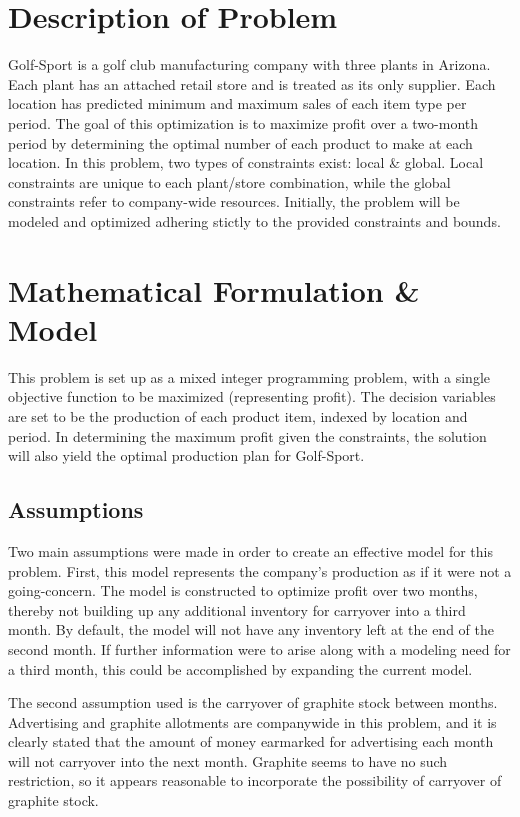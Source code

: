 \documentclass{article}
\begin{document}
\section{Description of Problem}
Golf-Sport is a golf club manufacturing company with three plants in Arizona.  Each plant has an attached retail store and is treated as its
only supplier.  Each location has predicted minimum and maximum sales of each item type per period.  The goal of this optimization is to maximize profit over a two-month period by determining the optimal number of each product to make
at each location.  In this problem, two types of constraints exist:  local \& global.  Local constraints are unique to each plant/store
 combination, while the global constraints refer to company-wide resources.  Initially, the problem will be modeled and optimized adhering stictly to the provided constraints and bounds.
\section{Mathematical Formulation \& Model}
This problem is set up as a mixed integer programming problem, with a single objective function to be maximized (representing profit).  
The decision variables are set to be the production of each product item, indexed by location and period.  In determining the maximum profit given the constraints, 
the solution will also yield the optimal production plan for Golf-Sport.
\subsection{Assumptions}
Two main assumptions were made in order to create an effective model for this problem.  First, this model represents the company's production as if it were not a 
going-concern.  The model is constructed to optimize profit over two months, thereby not building up any additional inventory for carryover into 
a third month.  By default, the model will not have any inventory left at the end of the second month.  If further information were to arise along with 
a modeling need for a third month, this could be accomplished by expanding the current model. \par
The second assumption used is the carryover of graphite stock between months.  Advertising and graphite allotments are companywide in this problem, and 
it is clearly stated that the amount of money earmarked for advertising each month will not carryover into the next month.  Graphite seems to have no such restriction, so 
it appears reasonable to incorporate the possibility of carryover of graphite stock.
\end{document}
